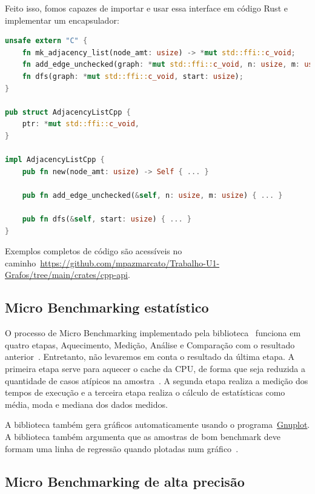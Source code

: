 Feito isso, fomos capazes de importar e usar essa interface em código
Rust e implementar um encapsulador:

\begin{lstlisting}[language=Rust, caption={Exemplo de uso de interface FFI escrita em Rust}, label=list:externCFfi]
unsafe extern "C" {
    fn mk_adjacency_list(node_amt: usize) -> *mut std::ffi::c_void;
    fn add_edge_unchecked(graph: *mut std::ffi::c_void, n: usize, m: usize);
    fn dfs(graph: *mut std::ffi::c_void, start: usize);
}

pub struct AdjacencyListCpp {
    ptr: *mut std::ffi::c_void,
}

impl AdjacencyListCpp {
    pub fn new(node_amt: usize) -> Self { ... }

    pub fn add_edge_unchecked(&self, n: usize, m: usize) { ... }

    pub fn dfs(&self, start: usize) { ... }
}
\end{lstlisting}

Exemplos completos de código são acessíveis no
caminho~\url{https://github.com/mpazmarcato/Trabalho-U1-Grafos/tree/main/crates/cpp-api}.

\subsection{Micro Benchmarking estatístico}

O processo de Micro Benchmarking implementado pela
biblioteca~\cite{criterionrust} funciona em quatro etapas,
Aquecimento, Medição, Análise e Comparação com o resultado
anterior~\citep{bheislerAnalysisProcess}.
Entretanto, não levaremos em conta o resultado da última etapa. A
primeira etapa serve para aquecer o cache da CPU, de forma que seja
reduzida a quantidade de casos atípicos na
amostra~\citep{bheislerAnalysisProcess}. A segunda etapa
realiza a medição dos tempos de execução e a terceira etapa realiza o
cálculo de estatísticas como média, moda e mediana dos dados medidos.

A biblioteca também gera gráficos automaticamente usando o
programa~\href{http://gnuplot.info/}{Gnuplot}. A biblioteca também argumenta
que as amostras de bom benchmark deve formam uma linha de regressão
quando plotadas num gráfico~\citep{bheislerAnalysisProcess}.

\subsection{Micro Benchmarking de alta precisão}

